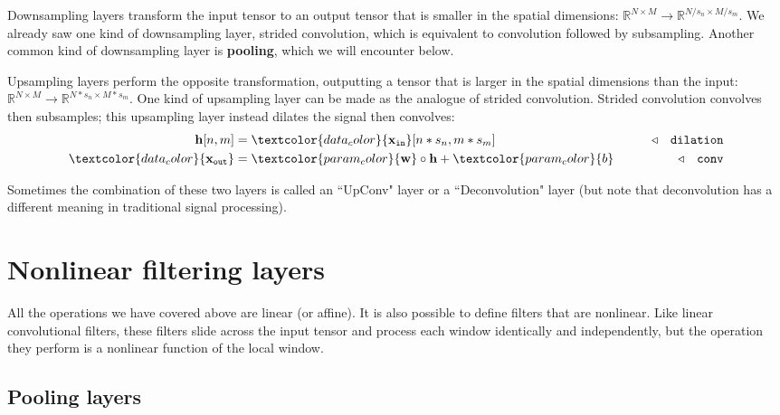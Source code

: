 Downsampling layers transform the input tensor to an output tensor that is smaller in the spatial dimensions: $\mathbb{R}^{N \times M} \rightarrow \mathbb{R}^{N/s_n \times M/s_m}$. We already saw one kind of downsampling layer, strided convolution, which is equivalent to convolution followed by subsampling. Another common kind of downsampling layer is {\bf pooling}, which we will encounter below.

Upsampling layers perform the opposite transformation, outputting a tensor that is larger in the spatial dimensions than the input: $\mathbb{R}^{N \times M} \rightarrow \mathbb{R}^{N*s_n \times M*s_m}$. One kind of upsampling layer can be made as the analogue of strided convolution. Strided convolution convolves then subsamples; this upsampling layer instead dilates the signal then convolves:
\begin{align}
    \mathbf{h}[n,m] &= \textcolor{data_color}{\xin}[n*s_n, m*s_m] & \quad\quad \triangleleft \quad \texttt{dilation}\label{eqn:convolutional_neural_nets:dilation}\\
    \textcolor{data_color}{\xout} &= \textcolor{param_color}{\mathbf{w}} \circ \mathbf{h} + \textcolor{param_color}{b} & \quad\quad \triangleleft \quad \texttt{conv}
\end{align}

Sometimes the combination of these two layers is called an ``UpConv" layer or a ``Deconvolution" layer (but note that deconvolution has a different meaning in traditional signal processing).


\section{Nonlinear filtering layers}

All the operations we have covered above are linear (or affine). It is also possible to define filters that are nonlinear. Like linear convolutional filters, these filters slide across the input tensor and process each window identically and independently, but the operation they perform is a nonlinear function of the local window.

\subsection{Pooling layers}

